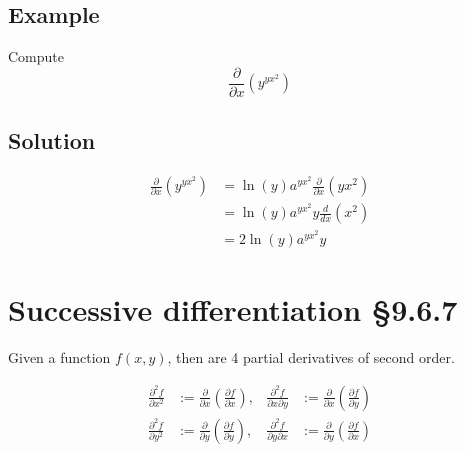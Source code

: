 \documentclass[11pt]{article}
\begin{document}
\subsection{Example}
Compute
\[ \frac{\partial}{\partial x} \left( y^{yx^2} \right) \]

\subsection{Solution}
\begin{align*}
\frac{\partial}{\partial x} \left( y^{yx^2} \right) &= \ln(y)a^{yx^2} \frac{\partial}{\partial x} \left( yx^2 \right) \\
&= \ln(y)a^{yx^2} y \frac{d}{dx} \left( x^2 \right) \\
&= 2 \ln(y)a^{yx^2} y
\end{align*}

\section{Successive differentiation §9.6.7}
Given a function $f(x, y)$, then are 4 partial derivatives of second order.

\begin{align*}
\frac{\partial^2 f}{\partial x^2} &:= \frac{\partial}{\partial x}\left( \frac{\partial f}{\partial x} \right), & \frac{\partial^2 f}{\partial x \partial y} &:= \frac{\partial}{\partial x}\left( \frac{\partial f}{\partial y} \right) \\
\frac{\partial^2 f}{\partial y^2} &:= \frac{\partial}{\partial y}\left( \frac{\partial f}{\partial y} \right), & \frac{\partial^2 f}{\partial y \partial x} &:= \frac{\partial}{\partial y}\left( \frac{\partial f}{\partial x} \right)
\end{align*}
\end{document}
